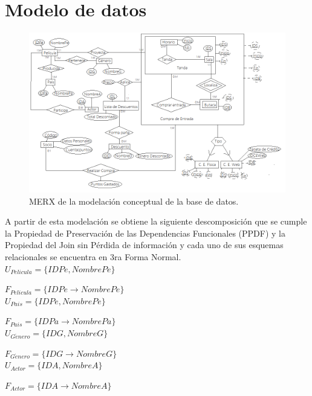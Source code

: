 \chapter{Modelo de datos}\label{ch:model}

\begin{figure}[h]
    \begin{center}
        \includegraphics[width=16.0cm]{./chapters/img/is.png}
    \end{center}

    \caption{MERX de la modelación conceptual de la base de datos.}
\end{figure}

A partir de esta modelación se obtiene la siguiente descomposición que se cumple la Propiedad de Preservación de las Dependencias Funcionales (PPDF) y la Propiedad del Join sin Pérdida de información  y cada uno de sus esquemas relacionales se encuentra en 3ra Forma Normal.\\
	
	$U_{Pelicula}=\{IDPe,NombrePe\}$
	
	$F_{Pelicula}=\{IDPe\rightarrow NombrePe\}$\\
	
	$U_{Pais}=\{IDPe,NombrePe\}$
	
	$F_{Pais}=\{IDPa\rightarrow NombrePa\}$\\
	
	$U_{G\acute{e}nero}=\{IDG, NombreG\}$
	
	$F_{G\acute{e}nero}=\{IDG\rightarrow NombreG\}$\\
	
	$U_{Actor}=\{IDA, NombreA\}$
		
	$F_{Actor}=\{IDA\rightarrow NombreA\}$\\
	
